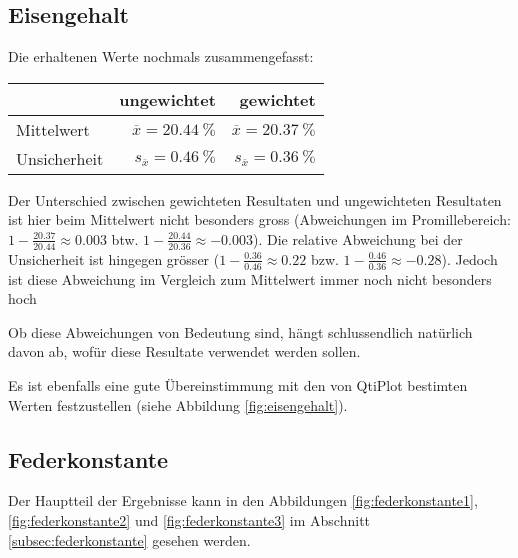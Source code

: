 \clearpage
\subsection{Eisengehalt}

Die erhaltenen Werte nochmals zusammengefasst:

\begin{center}
\begin{tabular}{lrr}
    \toprule
                 & ungewichtet & gewichtet \\
    \midrule
    Mittelwert       &     $\overline{x} = \SI{20.44}{\percent}$   &     $\overline{x} = \SI{20.37}{\percent}$ \\
    Unsicherheit     & $s_{\overline{x}} = \SI{0.46}{\percent}$    & $s_{\overline{x}} = \SI{0.36}{\percent}$ \\
    \bottomrule
\end{tabular}
\end{center}

Der   Unterschied   zwischen    gewichteten   Resultaten   und   ungewichteten
Resultaten    ist    hier    beim    Mittelwert    nicht    besonders    gross
(Abweichungen   im   Promillebereich: $1-\frac{20.37}{20.44}  \approx   0.003$
btw. $1-\frac{20.44}{20.36}  \approx -0.003$).   Die  relative Abweichung  bei
der Unsicherheit  ist hingegen  gr\"osser ($1-\frac{0.36}{0.46}  \approx 0.22$
bzw. $1-\frac{0.46}{0.36} \approx -0.28$). Jedoch ist diese Abweichung im Vergleich
zum Mittelwert immer noch nicht besonders hoch

Ob diese  Abweichungen von Bedeutung sind, h\"angt schlussendlich nat\"urlich
davon ab, wof\"ur diese Resultate verwendet werden sollen.

Es ist  ebenfalls eine  gute \"Ubereinstimmung mit  den von  QtiPlot bestimten
Werten festzustellen (siehe Abbildung \ref{fig:eisengehalt}).


\clearpage
\subsection{Federkonstante}

Der       Hauptteil        der       Ergebnisse       kann        in       den
Abbildungen    \ref{fig:federkonstante1},     \ref{fig:federkonstante2}    und
\ref{fig:federkonstante3}  im  Abschnitt  \ref{subsec:federkonstante}  gesehen
werden.

